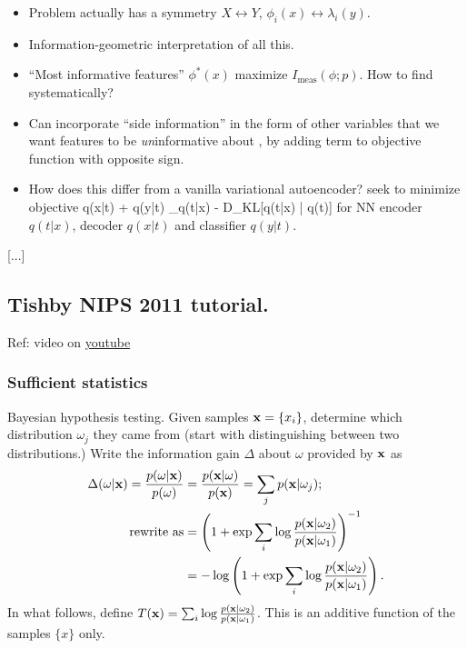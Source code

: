\documentclass[notitlepage,openany,11pt]{report}
\theoremstyle{plain}%
\numberwithin{equation}{section}
\begin{document}
\begin{itemize}
\item Problem actually has a symmetry $X \leftrightarrow Y$, $\phi_{i}(x) \leftrightarrow \lambda_{i}(y)$. 
\item Information-geometric interpretation of all this. 
\item ``Most informative features'' $\phi^{\ast}(x)$ maximize $I_{\text{meas}}( \phi; p)$. How to find systematically?
\item Can incorporate ``side information'' in the form of other variables that we want features to be \emph{un}informative about \cite{GlobersonEtAl:12}, by adding term to objective function with opposite sign.
\item How does this differ from a vanilla variational autoencoder? \cite{BanijamaliEtAl:18} seek to minimize objective 
\be
\langle \log q(x|t) + \log q(y|t) \rangle_{q(t|x)} - D_{KL}[q(t|x) | q(t)]
\ee
for NN encoder $q(t|x)$, decoder $q(x|t)$ and classifier $q(y|t)$.
\end{itemize}


[...]

\subsection{Tishby NIPS 2011 tutorial.} Ref: video on \href{https://www.youtube.com/watch?v=GKm53xGbAOk}{youtube}

\subsubsection{Sufficient statistics}
Bayesian hypothesis testing. Given samples $\mathbf{x} = \{x_{i}\}$, determine which distribution $\omega_{j}$ they came from (start with distinguishing between two distributions.) Write the information gain $\Delta$ about $\omega$ provided by $\mathbf{x}$ as
\begin{align*}
\Delta(\omega|\mathbf{x}) = \frac{p(\omega|\mathbf{x})}{p(\omega)} &= \frac{p(\mathbf{x}|\omega)}{p(\mathbf{x})} = \sum_{j}p(\mathbf{x}|\omega_{j}); \\
\text{rewrite as}   &= \left( 1+ \exp \sum_{i} \log \frac{p(\mathbf{x}|\omega_{2})}{p(\mathbf{x}|\omega_{1})} \right)^{-1} \\
&= - \log \left( 1 + \exp \sum_{i} \log \frac{p(\mathbf{x}|\omega_{2})}{p(\mathbf{x}|\omega_{1})} \right).
\end{align*}
In what follows, define $T(\mathbf{x}) = \sum_{i} \log \frac{p(\mathbf{x}|\omega_{2})}{p(\mathbf{x}|\omega_{1})}$. This is an additive function of the samples $\{x\}$ only.
\end{document}
